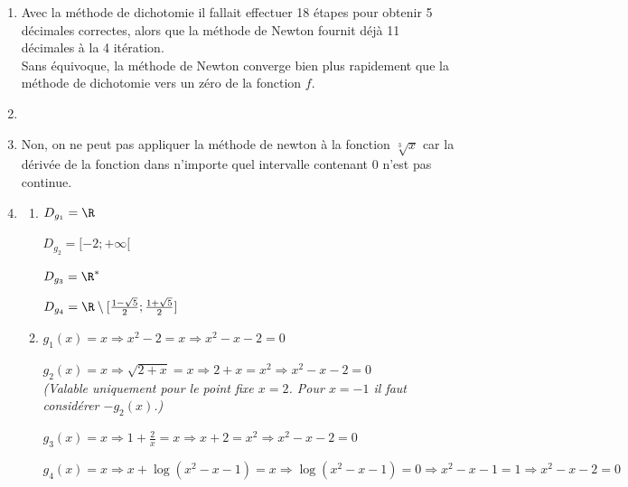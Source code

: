 \begin{enumerate}[label=R4.\arabic*, font=\bfseries, itemsep=8mm,labelsep*=4mm]
\medskip
Pour $u_4$ on obtient $\sqrt{2} \simeq 1,41421356237$
avec $11$ décimales exactes.







\item
Avec la méthode de dichotomie il fallait effectuer 18 étapes pour obtenir 5 décimales correctes, alors que la méthode de Newton fournit déjà 11 décimales à la 4 itération.\\
Sans équivoque, la méthode de Newton converge bien plus rapidement que la méthode de dichotomie vers un zéro de la fonction $f$. 







\item
{}







\item
Non, on ne peut pas appliquer la méthode de newton à la fonction $\sqrt[3]{x}$ car la dérivée de la fonction dans n'importe quel intervalle contenant 0 n'est pas continue.







\item
\begin{enumerate}[label=\roman*),itemsep=3mm]
\item $D_{g_1}=\R$

\smallskip
$D_{g_2}=[-2;+\infty[$

\smallskip
$D_{g_3}=\R^{\ast}$

\smallskip
$\textstyle D_{g_4}=\R\setminus [\frac{1-\sqrt{5}}{2};\frac{1+\sqrt{5}}{2}]$
\item $g_1(x)=x \Rightarrow x^2-2=x \Rightarrow x^2-x-2=0$

\smallskip
$g_2(x)=x \Rightarrow \sqrt{2+x}=x \Rightarrow 2+x=x^2 \Rightarrow x^2-x-2=0$\\
\textit{\small (Valable uniquement pour le point fixe $x=2$. Pour $x=-1$ il faut considérer $-g_2(x)$.)}

\smallskip
$g_3(x)=x \Rightarrow 1+\frac{2}{x}=x \Rightarrow x+2=x^2 \Rightarrow x^2-x-2=0$

\smallskip
$g_4(x)=x \Rightarrow x+\log(x^2-x-1)=x \Rightarrow \log(x^2-x-1)=0 \Rightarrow x^2-x-1=1  \Rightarrow x^2-x-2=0$


\end{enumerate}
\end{enumerate}
